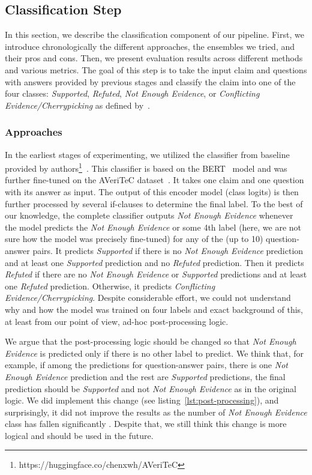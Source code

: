 
\subsection{Classification Step}
In this section, we describe the classification component of our pipeline. First, we introduce chronologically the different approaches, the ensembles we tried, and their pros and cons. Then, we present evaluation results across different methods and various metrics. The goal of this step is to take the input claim and questions with answers provided by previous stages  and classify the claim into one of the four classes: \textit{Supported}, \textit{Refuted}, \textit{Not Enough Evidence}, or \textit{Conflicting Evidence/Cherrypicking} as defined by~\citealp{averitec2024}.

\subsubsection{Approaches}

In the earliest stages of experimenting, we utilized the classifier from baseline provided by authors\footnote{https://huggingface.co/chenxwh/AVeriTeC}~\cite{averitec2024}. This classifier is based on the BERT~\cite{devlin-etal-2019-bert} model and was further fine-tuned on the AVeriTeC dataset~\cite{averitec2024}. It takes one claim and one question with its answer as input. The output of this encoder model (class logits) is then further processed by several if-clauses to determine the final label. To the best of our knowledge, the complete classifier outputs \textit{Not Enough Evidence} whenever the model predicts the \textit{Not Enough Evidence} or some 4th label (here, we are not sure how the model was precisely fine-tuned) for any of the (up to 10) question-answer pairs. It predicts \textit{Supported} if there is no \textit{Not Enough Evidence} prediction and at least one \textit{Supported} prediction and no \textit{Refuted} prediction. Then it predicts \textit{Refuted} if there are no \textit{Not Enough Evidence} or \textit{Supported} predictions and at least one \textit{Refuted} prediction. Otherwise, it predicts \textit{Conflicting Evidence/Cherrypicking}. Despite considerable effort, we could not understand why and how the model was trained on four labels and exact background of this, at least from our point of view, ad-hoc post-processing logic.

We argue that the post-processing logic should be changed so that \textit{Not Enough Evidence} is predicted only if there is no other label to predict. We think that, for example, if among the predictions for question-answer pairs, there is one \textit{Not Enough Evidence} prediction and the rest are \textit{Supported} predictions, the final prediction should be \textit{Supported} and not \textit{Not Enough Evidence} as in the original logic. We did implement this change (see listing~\ref{lst:post-processing}), and surprisingly, it did not improve the results as the number of \textit{Not Enough Evidence} class has fallen significantly . Despite that, we still think this change is more logical and should be used in the future.

